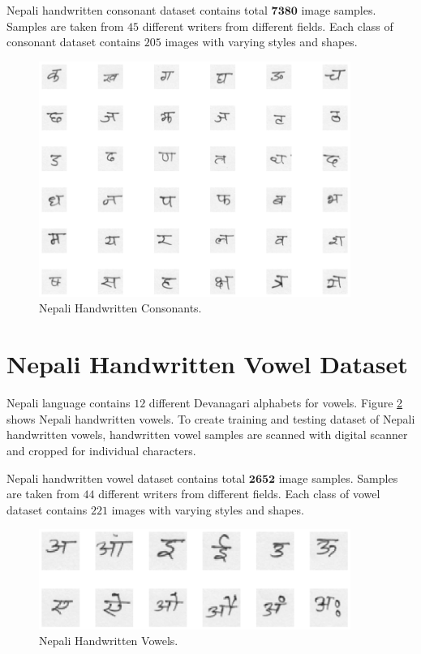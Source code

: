 Nepali handwritten consonant dataset contains total $\textbf{7380}$ image samples. Samples are taken from $45$ different writers from different fields. Each class of consonant dataset contains $205$ images with varying styles and shapes.
\begin{figure}[h]
\centering
\includegraphics[width=4in]{figures/datasets/nhcr/ka_kha_sample.eps}
\caption{Nepali Handwritten Consonants.}
\label{figure_ka_kha}
\end{figure}

\section{Nepali Handwritten Vowel Dataset}
\label{section_vowel_dataset}
Nepali language contains $12$ different Devanagari alphabets for vowels. Figure \ref{figure_a_aa} shows Nepali handwritten vowels. To create training and testing dataset of Nepali handwritten vowels, handwritten vowel samples are scanned with digital scanner and cropped for individual characters.

Nepali handwritten vowel dataset contains total $\textbf{2652}$ image samples. Samples are taken from $44$ different writers from different fields. Each class of vowel dataset contains $221$ images with varying styles and shapes.
\begin{figure}[h]
\centering
\includegraphics[width=4in]{figures/datasets/nhcr/a_aa_sample.eps}
\caption{Nepali Handwritten Vowels.}
\label{figure_a_aa}
\end{figure}

